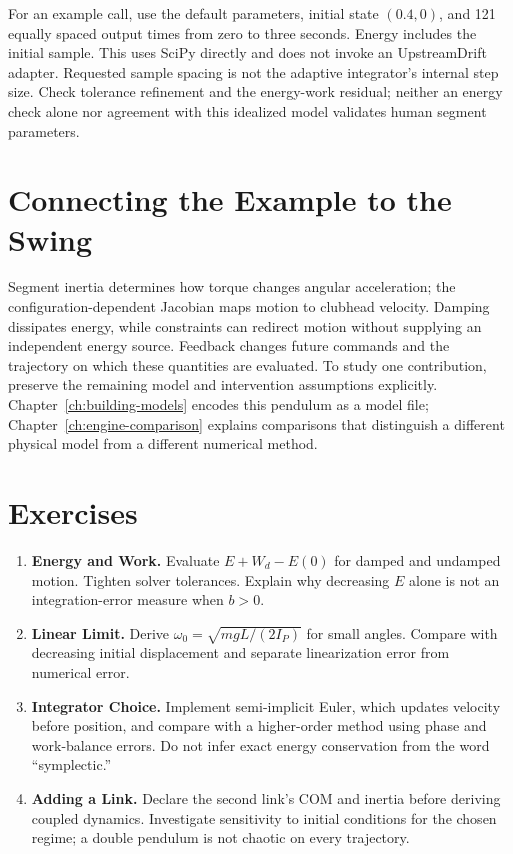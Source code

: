 For an example call, use the default parameters, initial state $(0.4,0)$,
and 121 equally spaced output times from zero to three seconds.
Energy includes the initial sample. This uses
SciPy directly and does not invoke an UpstreamDrift adapter. Requested sample
spacing is not the adaptive integrator's internal step size. Check tolerance
refinement and the energy-work residual; neither an energy check alone nor
agreement with this idealized model validates human segment parameters.

\section{Connecting the Example to the Swing}

Segment inertia determines how torque changes angular acceleration; the
configuration-dependent Jacobian maps motion to clubhead velocity. Damping
dissipates energy, while constraints can redirect motion without supplying an
independent energy source. Feedback changes future commands and the trajectory
on which these quantities are evaluated. To study one contribution, preserve
the remaining model and intervention assumptions explicitly.
Chapter~\ref{ch:building-models} encodes this pendulum as a model file;
Chapter~\ref{ch:engine-comparison} explains comparisons that distinguish a
different physical model from a different numerical method.

\section*{Exercises}
\begin{enumerate}
 \item \textbf{Energy and Work.} Evaluate $E+W_d-E(0)$ for damped and undamped
 motion. Tighten solver tolerances. Explain why decreasing $E$ alone is not an
 integration-error measure when $b>0$.
 \item \textbf{Linear Limit.} Derive $\omega_0=\sqrt{mgL/(2I_P)}$ for small
 angles. Compare with decreasing initial displacement and separate
 linearization error from numerical error.
 \item \textbf{Integrator Choice.} Implement semi-implicit Euler, which updates
 velocity before position, and compare with a higher-order method using phase
 and work-balance errors. Do not infer exact energy conservation from the word
 ``symplectic.''
 \item \textbf{Adding a Link.} Declare the second link's COM and inertia before
 deriving coupled dynamics. Investigate sensitivity to initial conditions for
 the chosen regime; a double pendulum is not chaotic on every trajectory.
\end{enumerate}
